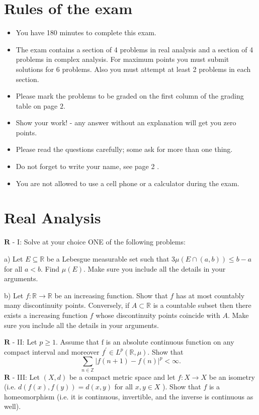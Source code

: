 \documentclass[10pt]{article}
\begin{document}
\section{Rules of the exam}
\begin{itemize}
  \item You have 180 minutes to complete this exam.

  \item The exam contains a section of 4 problems in real analysis and a section of 4 problems in complex analysis. For maximum points you must submit solutions for 6 problems. Also you must attempt at least 2 problems in each section.

  \item Please mark the problems to be graded on the first column of the grading table on page $2 .$

  \item Show your work! - any answer without an explanation will get you zero points.

  \item Please read the questions carefully; some ask for more than one thing.

  \item Do not forget to write your name, see page 2 .

  \item You are not allowed to use a cell phone or a calculator during the exam.

\end{itemize}
\section{Real Analysis}
$\mathbf{R}$ - I: Solve at your choice ONE of the following problems:

a) Let $E \subseteq \mathbb{R}$ be a Lebesgue measurable set such that $3 \mu(E \cap(a, b)) \leq b-a$ for all $a<b$. Find $\mu(E)$. Make sure you include all the details in your arguments.

b) Let $f: \mathbb{R} \rightarrow \mathbb{R}$ be an increasing function. Show that $f$ has at most countably many discontinuity points. Conversely, if $A \subset \mathbb{R}$ is a countable subset then there exists a increasing function $f$ whose discontinuity points coincide with $A$. Make sure you include all the details in your arguments.

$\mathbf{R}$ - II: Let $p \geq 1$. Assume that $\mathrm{f}$ is an absolute continuous function on any compact interval and moreover $f^{\prime} \in L^{p}(\mathbb{R}, \mu)$. Show that
$$
\sum_{n \in \mathbb{Z}}|f(n+1)-f(n)|^{p}<\infty .
$$
$\mathbf{R}$ - III: Let $(X, d)$ be a compact metric space and let $f: X \rightarrow X$ be an isometry (i.e. $d(f(x), f(y))=d(x, y)$ for all $x, y \in X$ ). Show that $f$ is a homeomorphism (i.e. it is continuous, invertible, and the inverse is continuous as well).
\end{document}
